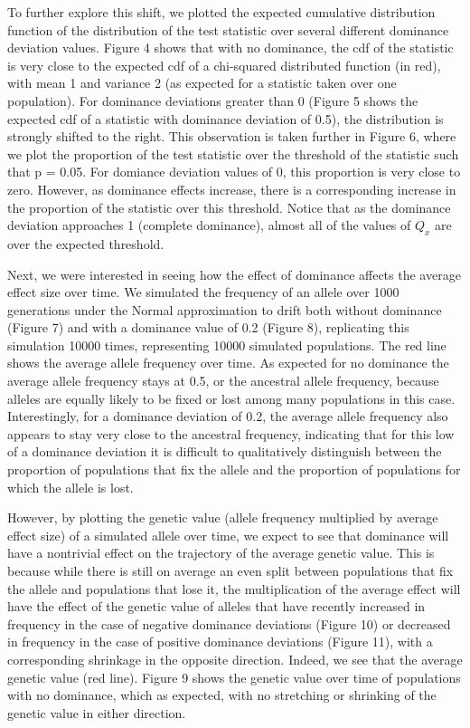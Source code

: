\documentclass[a4paper,12pt]{article}
\begin{document}
To further explore this shift, we plotted the expected cumulative
distribution function of the distribution of the test statistic over
several different dominance deviation values. Figure 4 shows that with
no dominance, the cdf of the statistic is very close to the expected
cdf of a chi-squared distributed function (in red), with mean 1 and variance 2
(as expected for a statistic taken over one population). For dominance
deviations greater than 0 (Figure 5 shows the expected cdf of a
statistic with dominance deviation of 0.5), the distribution is
strongly shifted to the right. This observation is taken further in
Figure 6, where we plot the proportion of the test statistic over the
threshold of the statistic such that p = 0.05. For domiance deviation
values of 0, this proportion is very close to zero. However, as
dominance effects increase, there is a corresponding increase in the
proportion of the statistic over this threshold. Notice that as the
dominance deviation approaches 1 (complete dominance), almost all of
the values of $Q_x$ are  over the expected threshold.

Next, we were interested in seeing how the effect of dominance affects
the average effect size over time. We simulated the frequency of an
allele over 1000 generations under the Normal approximation to drift
both without dominance (Figure 7) and with a dominance value of 0.2
(Figure 8), replicating this simulation 10000 times, representing 10000
simulated populations. The red line shows the average allele frequency
over time. As expected for no dominance the average allele frequency
stays at 0.5, or the ancestral allele frequency, because alleles
are equally likely to be fixed or lost among many populations in this
case. Interestingly, for a dominance deviation of 0.2, the average allele
frequency also appears to stay very close to the ancestral frequency,
indicating that for this low of a dominance deviation it is difficult
to qualitatively distinguish between the proportion of populations
that fix the allele and the proportion of populations for which the
allele is lost.

However, by plotting the genetic value (allele frequency multiplied by
average effect size) of a simulated allele over time, we expect to see
that dominance will have a nontrivial effect on the trajectory of the
average genetic value. This is because while there is still on average
an even split between populations that fix the allele and populations
that lose it, the multiplication of the average effect will have the
effect of  the genetic value of alleles that have
recently increased in frequency in the case of negative dominance
deviations (Figure 10) or decreased in frequency in the case of
positive dominance deviations (Figure 11), with a corresponding
shrinkage in the opposite direction. Indeed, we see that the
average genetic value (red line). Figure 9 shows the genetic value
over time of populations with no dominance, which as expected, with no
stretching or shrinking of the genetic value in either direction.
\end{document}
